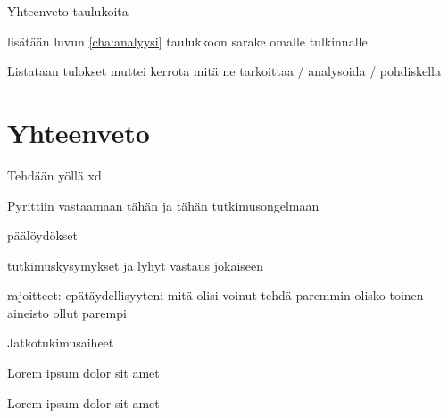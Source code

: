 \documentclass[bscthesis,finnish,oneside,biblatex]{uefcsthesis}
\begin{document}
Yhteenveto taulukoita

lisätään luvun \ref{cha:analyysi} taulukkoon sarake omalle tulkinnalle

Listataan tulokset muttei kerrota mitä ne tarkoittaa / analysoida / pohdiskella


\chapter{Yhteenveto}
\label{cha:yhteenveto}

Tehdään yöllä xd

Pyrittiin vastaamaan tähän ja tähän tutkimusongelmaan

päälöydökset

tutkimuskysymykset ja lyhyt vastaus jokaiseen

rajoitteet:
epätäydellisyyteni
mitä olisi voinut tehdä paremmin
olisko toinen aineisto ollut parempi

Jatkotukimusaiheet

Lorem ipsum dolor sit amet\citep{zafari2019survey}

\citet{zafari2019survey} Lorem ipsum dolor sit amet

\printbibliography[heading=bibintoc]

\backmatter %
\end{document}
